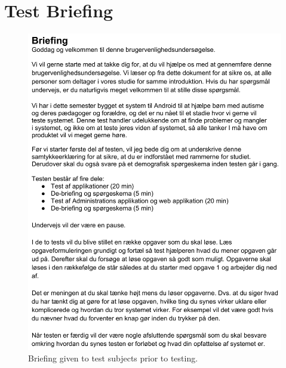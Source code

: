\section{Test Briefing}
\begin{figure}[h!]
	\centering
	\includegraphics[scale=0.8]{gfx/usability-briefing.png}
	\caption{Briefing given to test subjects prior to testing.}
	\label{fig:usability_briefing}
\end{figure}

